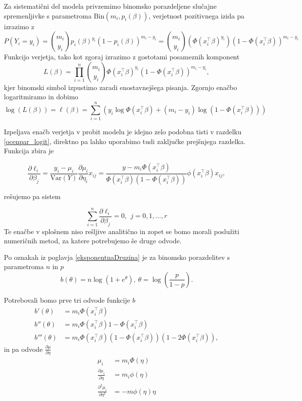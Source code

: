\documentclass[12pt,a4paper]{amsart}
\theoremstyle{definition} %
\theoremstyle{plain} %
\begin{document}
Za sistematični del modela privzemimo binomsko porazdeljene slučajne spremenljivke s parametroma $\mathrm{Bin}(m_{i},p_{i}(\beta))$,
verjetnost pozitivnega izida pa izrazimo z
\[
    P(Y_{i} = y_{i}) = \binom{m_{i}}{y_{i}}p_{i}(\beta)^{y_{i}}(1 - p_{i}(\beta))^{m_{i} - y_{i}} = \binom{m_{i}}{y_{i}} (\Phi(x_{i}^\top \beta)^{y_{i}})(1 - \Phi(x_{i}^\top \beta))^{m_{i} - y_{i}} 
\]
Funkcijo verjetja, tako kot zgoraj izrazimo z gostotami posameznih komponent
\[
    L(\beta) = \prod_{i=1}^{n} \binom{m_{i}}{y_{i}} \Phi(x_{i}^\top\beta)^{y_{i}}(1 - \Phi(x_{i}^\top\beta))^{m_{i} - y_{i}},
\]
kjer binomski simbol izpustimo zaradi enostavnejšega pisanja. Zgornjo enačbo logaritmiramo in dobimo
\begin{equation}
    \log(L(\beta)) = \ell(\beta) = \sum_{i = 1}^{n}\left(y_{i}\log\Phi(x_{i}^\top\beta) + (m_{i} - y_{i})\log(1 - \Phi(x_{i}^\top\beta)) \right)
\end{equation}

Izpeljava enačb verjetja v probit modelu je idejno zelo podobna tisti v razdelku \ref{ocenpar_logit}, direktno pa lahko uporabimo tudi zaključke prejšnjega razdelka. Funkcija zbira je

\[
    \frac{\partial \ell_{i}}{\partial\beta_{j}} = \frac{y_{i} - \mu_{i}}{\mathrm{Var}(Y)}\frac{\partial\mu_{i}}{\partial\eta_{i}}x_{ij} = \frac{y-m_{i}\Phi(x_{i}^\top\beta)}{\Phi(x_{i}^\top\beta)(1-\Phi(x_{i}^\top\beta))}\phi(x_{i}^\top\beta)x_{ij},
\]

rešujemo pa sistem

\begin{equation}
    \sum_{i = 1}^{n}\frac{\partial \ell_{i}}{\partial\beta_{j}} = 0,~~j=0,1,\ldots,r
\end{equation}
Te enačbe v splošnem niso rešljive analitično in zopet se bomo morali poslužiti numeričnih metod, za katere potrebujemo še druge odvode.

Po oznakah iz poglavja \ref{eksponentnaDruzina} je za binomsko porazdelitev s parametroma $n$ in $p$
\[
    b(\theta) = n\log(1+e^{\theta}),~\theta = \log\left(\frac{p}{1-p}\right).
\]

Potrebovali bomo prve tri odvode funkcije $b$
\begin{align*}
    b'(\theta) &= m_{i}\Phi(x_{i}^\top\beta) \\
    b''(\theta) &= m_{i}\Phi(x_{i}^\top\beta)1-\Phi(x_{i}^\top\beta) \\
    b'''(\theta) &= m_{i}\Phi(x_{i}^\top\beta)(1-\Phi(x_{i}^\top\beta))(1-2\Phi(x_{i}^\top\beta)),
\end{align*}
in pa odvode $\tfrac{\partial\mu}{\partial\eta}$
\begin{align*}
    \mu_{i} &= m_{i}\Phi(\eta) \\
    \frac{\partial\mu_{i}}{\partial\eta} &= m_{i}\phi(\eta) \\
    \frac{\partial^2\mu_{i}}{\partial\eta^2} & = -m\phi(\eta)\eta
\end{align*}
\end{document}
